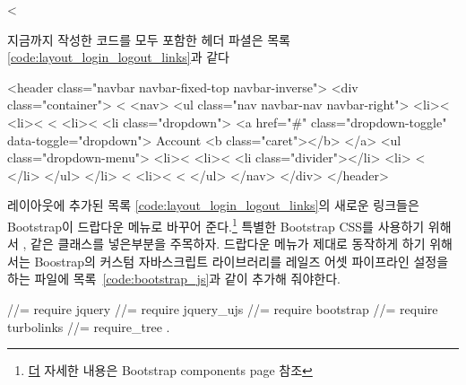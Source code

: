 \begin{code} < \end{code} 

\noindent 지금까지 작성한 코드를 모두 포함한 헤더 파셜은 목록 \ref{code:layout_login_logout_links}과 같다 

\begin{codelisting} \label{code:layout_login_logout_links}  

\begin{code} <header class="navbar navbar-fixed-top navbar-inverse"> <div class="container"> < <nav> <ul class="nav navbar-nav navbar-right"> <li>< <li>< < <li>< <li class="dropdown"> <a href="#" class="dropdown-toggle" data-toggle="dropdown"> Account <b class="caret"></b> </a> <ul class="dropdown-menu"> <li>< <li>< <li class="divider"></li> <li> < </li> </ul> </li> < <li>< < </ul> </nav> </div> </header> \end{code} \end{codelisting} 

레이아웃에 추가된 목록 \ref{code:layout_login_logout_links}의 새로운 링크들은 Bootstrap이 드랍다운 메뉴로 바꾸어 준다.\footnote{\href{http://getbootstrap.com/components/}더 자세한 내용은 {Bootstrap components page} 참조} 특별한 Bootstrap CSS를 사용하기 위해서 , 같은 클래스를 넣은부분을 주목하자. 드랍다운 메뉴가 제대로 동작하게 하기 위해서는 Boostrap의 커스텀 자바스크립트 라이브러리를 레일즈 어셋 파이프라인 설정을 하는  파일에 목록~\ref{code:bootstrap_js}과 같이 추가해 줘야한다. 

\begin{codelisting} \label{code:bootstrap_js}  

\begin{code} //= require jquery //= require jquery_ujs //= require bootstrap //= require turbolinks //= require_tree . \end{code} \end{codelisting} 

